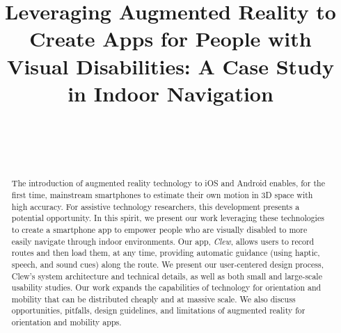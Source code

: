 \documentclass[chi_draft]{sigchi}
\def\plaintitle{Leveraging Augmented Reality to Create Apps for People with Visual Disabilities: A Case Study in Indoor Navigation}
\begin{document}
\title{\plaintitle}

\author{%
  \\
  \\
  \\
}

\maketitle

\begin{abstract}
The introduction of augmented reality technology to iOS and Android enables, for the first time, mainstream smartphones to estimate their own motion in 3D space with high accuracy.  For assistive technology researchers, this development presents a potential opportunity.  In this spirit, we present our work leveraging these technologies to create a smartphone app to empower people who are visually disabled to more easily navigate through indoor environments.  Our app, \emph{Clew}, allows users to record routes and then load them, at any time, providing automatic guidance (using haptic, speech, and sound cues) along the route.  We present our user-centered design process, Clew's system architecture and technical details, as well as both small and large-scale usability studies.  Our work expands the capabilities of technology for orientation and mobility that can be distributed cheaply and at massive scale.  We also discuss opportunities, pitfalls, design guidelines, and limitations of augmented reality for orientation and mobility apps.
\end{abstract}

\end{document}
